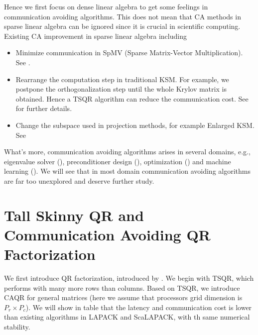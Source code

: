 \documentclass{article}
\begin{document}
Hence we first focus on dense linear algebra to get some feelings in communication avoiding algorithms. This does not mean that CA methods in sparse linear algebra can be ignored since it is crucial in scientific computing. Existing CA improvement in sparse linear algebra including 
\begin{itemize}
	\item Minimize communication in SpMV (Sparse Matrix-Vector Multiplication). See \cite{demmel_avoiding_2008,mohiyuddin_minimizing_2009}.
	\item Rearrange the computation step in traditional KSM. For example, we postpone the orthogonalization step until the whole Krylov matrix is obtained. Hence a TSQR algorithm can reduce the communication cost. See \cite{hoemmen_communication-avoiding_nodate} for further details.
	\item Change the subspace used in projection methods, for example Enlarged KSM. See \cite{grigori_enlarged_2016}
\end{itemize}

What's more, communication avoiding algorithms arises in several domains, e.g., eigenvalue solver (\cite{Ballard:EECS-2011-14}), preconditioner design (\cite{grigori_communication_2015}), optimization (\cite{soori_avoiding_2017}) and machine learning (\cite{you_ca-svm_2015, Koanantakool:EECS-2017-221}). We will see that in most domain communication avoiding algorithms are far too unexplored and deserve further study.

 \section{Tall Skinny QR and Communication Avoiding QR Factorization}
 We first introduce QR factorization, introduced by \cite{demmel_communication-optimal_2012}. We begin with TSQR, which performs with many more rows than columns. Based on TSQR, we introduce CAQR for general matrices (here we assume that processors grid dimension is $P_r \times P_c$). We will show in table that the latency and communication cost is lower than existing algorithms in LAPACK and ScaLAPACK, with th same numerical stability.
\end{document}
